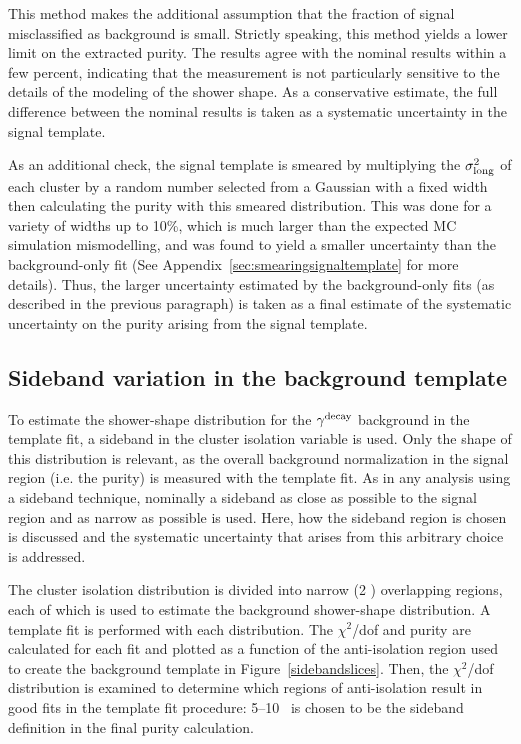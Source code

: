 This method makes the additional assumption that the fraction of signal misclassified as background is small. Strictly speaking, this method yields a lower limit on the extracted purity. The results agree with the nominal results within a few percent, indicating that the measurement is not particularly sensitive to the details of the modeling of the shower shape. As a conservative estimate, the full difference between the nominal results is taken as a systematic uncertainty in the signal template.

As an additional check, the signal template is smeared by multiplying the $\sigma^{2}_{\mathrm{long}}$ of each cluster by a random number selected from a Gaussian with a fixed width then calculating the purity with this smeared distribution. This was done for a variety of widths up to 10\%, which is much larger than the expected MC simulation mismodelling, and was found to yield a smaller uncertainty than the background-only fit (See Appendix~\ref{sec:smearingsignaltemplate} for more details). Thus, the larger uncertainty estimated by the background-only fits (as described in the previous paragraph) is taken as a final estimate of the systematic uncertainty on the purity arising from the signal template.

\FloatBarrier
\subsection{Sideband variation in the background template}
\label{sec:bkgtemplate}
To estimate the shower-shape distribution for the $\gamma^\mathrm{decay}$ background in the template fit, a sideband in the cluster isolation variable is used. Only the shape of this distribution is relevant, as the overall background normalization in the signal region (i.e. the purity) is measured with the template fit. As in any analysis using a sideband technique, nominally a sideband as close as possible to the signal region and as narrow as possible is used. Here, how the sideband region is chosen is discussed and the systematic uncertainty that arises from this arbitrary choice is addressed.

The cluster isolation distribution is divided into narrow (2 \GeVc) overlapping regions, each of which is used to estimate the background shower-shape distribution. A template fit is performed with each distribution. The $\chi^2$/dof and purity are calculated for each fit and plotted as a function of the anti-isolation region used to create the background template in Figure~\ref{sidebandslices}. Then, the $\chi^2$/dof distribution is examined to determine which regions of anti-isolation result in good fits in the template fit procedure: 5--10 \GeVc~is chosen to be the sideband definition in the final purity calculation.

